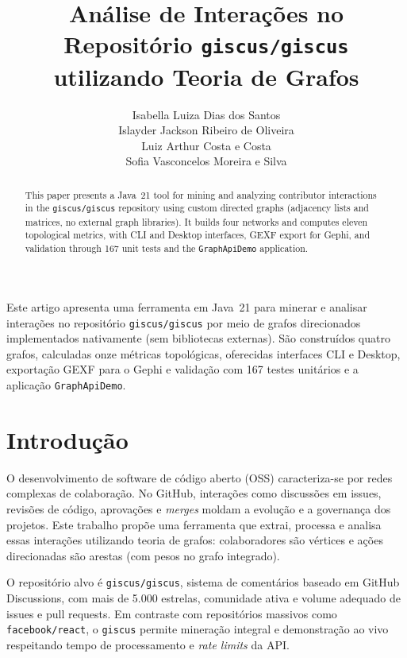\documentclass[12pt]{article}
\title{Análise de Interações no Repositório \texttt{giscus/giscus} utilizando Teoria de Grafos}
\author{
  Isabella Luiza Dias dos Santos\inst{1} \\
  Islayder Jackson Ribeiro de Oliveira\inst{2} \\
  Luiz Arthur Costa e Costa\inst{3} \\
  Sofia Vasconcelos Moreira e Silva\inst{4}
}
\begin{document}
 
\maketitle
\begin{abstract}
  This paper presents a Java~21 tool for mining and analyzing contributor interactions in the \texttt{giscus/giscus} repository using custom directed graphs (adjacency lists and matrices, no external graph libraries). It builds four networks and computes eleven topological metrics, with CLI and Desktop interfaces, GEXF export for Gephi, and validation through 167 unit tests and the \texttt{GraphApiDemo} application.
\end{abstract}

\begin{resumo}
  Este artigo apresenta uma ferramenta em Java~21 para minerar e analisar interações no repositório \texttt{giscus/giscus} por meio de grafos direcionados implementados nativamente (sem bibliotecas externas). São construídos quatro grafos, calculadas onze métricas topológicas, oferecidas interfaces CLI e Desktop, exportação GEXF para o Gephi e validação com 167 testes unitários e a aplicação \texttt{GraphApiDemo}.
\end{resumo}
\section{Introdução}

O desenvolvimento de software de código aberto (OSS) caracteriza-se por redes complexas de colaboração. No GitHub, interações como discussões em issues, revisões de código, aprovações e \textit{merges} moldam a evolução e a governança dos projetos. Este trabalho propõe uma ferramenta que extrai, processa e analisa essas interações utilizando teoria de grafos: colaboradores são vértices e ações direcionadas são arestas (com pesos no grafo integrado).

O repositório alvo é \texttt{giscus/giscus}, sistema de comentários baseado em GitHub Discussions, com mais de 5.000 estrelas, comunidade ativa e volume adequado de issues e pull requests. Em contraste com repositórios massivos como \texttt{facebook/react}, o \texttt{giscus} permite mineração integral e demonstração ao vivo respeitando tempo de processamento e \textit{rate limits} da API.
\end{document}
